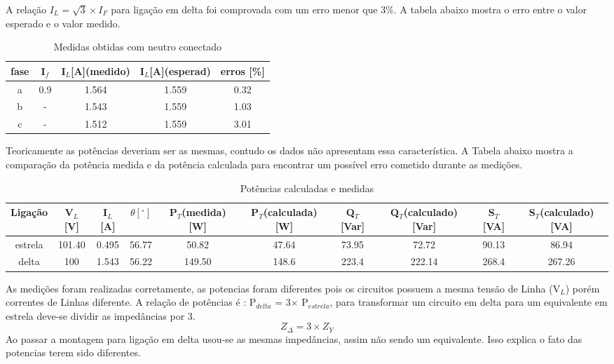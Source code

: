 \documentclass[a4paper, 12pt]{article}
\begin{document}
    A relação \(I_L = \sqrt{3}\times I_F\) para ligação em delta foi comprovada com um erro menor que 3\%. A tabela abaixo mostra o erro entre o valor esperado e o valor medido.
    \begin{table}[H]
         \centering
        \begin{tabular}{|c|c|c|c|c|}
              \hline %
                  fase & I\(_f\) & I\(_L\)[A](medido) & I\(_L\)[A](esperad) & erros [\%] \\
              \hline %
           a & 0.9 & 1.564 & 1.559 & 0.32     \\ 
              \hline %
           b & - & 1.543 & 1.559 & 1.03     \\ 
              \hline %
           c & - & 1.512 & 1.559 & 3.01     \\ 
              \hline %
        \end{tabular}
        \caption{Medidas obtidas com neutro conectado}
    \end{table}

    Teoricamente as potências deveriam ser as mesmas, contudo os dados não apresentam essa característica. A Tabela abaixo mostra a comparação da potência medida e da potência calculada para encontrar um possível erro cometido durante as medições.


    \begin{table}[H]
         \centering
        \begin{tabular}{|c|c|c|c|c|c|c|c|c|c|}
              \hline %
                   Ligação & V\(_L\)[V] & I\(_L\)[A] & \(\theta [^\circ]\) & P\(_T\)(medida)[W] & P\(_T\)(calculada)[W] & Q\(_T\)[Var] & Q\(_T\)(calculado)[Var] & S\(_T\)[VA] & S\(_T\)(calculado)[VA] \\
              \hline %
           estrela & 101.40 & 0.495 & 56.77 & 50.82 & 47.64 & 73.95 & 72.72 & 90.13 & 86.94     \\ 
              \hline %
           delta & 100 & 1.543 & 56.22 & 149.50 & 148.6 & 223.4 & 222.14 & 268.4 & 267.26     \\ 
              \hline %
        \end{tabular}
        \caption{Potências calculadas e medidas}
    \end{table}
    As medições foram realizadas corretamente, as potencias foram diferentes pois os circuitos possuem a mesma tensão de Linha (V\(_L\)) porém correntes de Linhas diferente.
    A relação de potências é :  P\(_{delta}  \) = 3\(\times\) P\(_{estrela}\), para transformar um circuito em delta para um equivalente em estrela deve-se dividir as impedâncias por 3. 
    \[Z_{\Delta} = 3\times Z_{Y} \]
    Ao passar a montagem para ligação em delta usou-se as mesmas impedâncias, assim não sendo um equivalente. Isso explica o fato das potencias terem sido diferentes.
    
\end{document}
